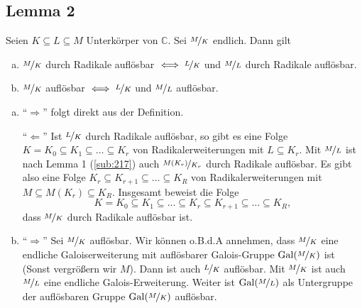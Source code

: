 
\subsection[Lemma 2: Transitivität der beiden Auflösbarkeitsbegriffe]{Lemma 2} %
\label{sub:218}
Seien $K \subseteq L \subseteq M$ Unterkörper von $\mathds{C}$. Sei $\nicefrac{M}{K}$ endlich. Dann gilt
\begin{enumerate}[a)]
	\item $\nicefrac{M}{K}$ durch Radikale auflösbar $\iff \nicefrac{L}{K}$ und $\nicefrac{M}{L}$ durch Radikale auflösbar.
	\item $\nicefrac{M}{K}$ auflösbar $\iff \nicefrac{L}{K}$ und $\nicefrac{M}{L}$ auflösbar.
\end{enumerate}
\begin{enumerate}[a)]
	\item \enquote{$\Longrightarrow$} folgt direkt aus der Definition.
	
	\enquote{$\Longleftarrow$} Ist $\nicefrac{L}{K}$ durch Radikale auflösbar, so gibt es eine Folge $K=K_0 \subseteq K_1 \subseteq \ldots \subseteq K_r$ von 
	Radikalerweiterungen mit $L \subseteq K_r$. Mit $\nicefrac{M}{L}$ ist nach Lemma 1 (\ref{sub:217}) auch $\nicefrac{M(K_r)}{K_r}$ durch Radikale auflösbar. Es gibt also
	eine Folge $K_r \subseteq K_{r+1} \subseteq \ldots \subseteq K_R$ von Radikalerweiterungen mit $M \subseteq M(K_r) \subseteq K_R$. Insgesamt beweist die Folge
	\[
		K=K_0 \subseteq K_1 \subseteq \ldots \subseteq K_r \subseteq K_{r+1} \subseteq \ldots \subseteq K_R,
	\]
	dass $\nicefrac{M}{K}$ durch Radikale auflösbar ist.
	\item \enquote{$\Longrightarrow$} Sei $\nicefrac{M}{K}$ auflösbar. Wir können o.B.d.A annehmen, dass $\nicefrac{M}{K}$ eine endliche Galoiserweiterung mit 
	auflösbarer Galois-Gruppe $\operatorname{Gal}(\nicefrac{M}{K})$ ist (Sonst vergrößern wir $M$). Dann ist auch $\nicefrac{L}{K}$ auflösbar. Mit $\nicefrac{M}{K}$ ist auch 
	$\nicefrac{M}{L}$ eine endliche Galois-Erweiterung. Weiter ist $\operatorname{Gal}(\nicefrac{M}{L})$ als Untergruppe der auflösbaren Gruppe $\operatorname{Gal}(\nicefrac{M}{K})$ auflösbar.
	
	
	

\end{enumerate}
